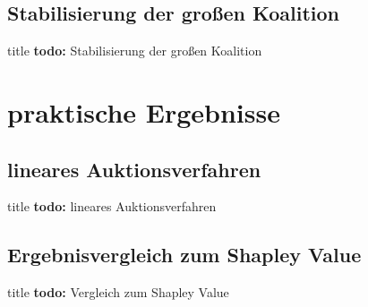 \documentclass[c]{beamer}
\newcommand\todo[1]{\colorbox{blue!15}{\textbf{todo: }#1}\newline}
\theoremstyle{break}
\begin{document}
  
  \subsection*{Stabilisierung der großen Koalition}
  \begin{frame}{title} %
    \todo{Stabilisierung der großen Koalition}
    \begin{lemma}[Instabilität]

    \end{lemma}
  \end{frame}

  \section*{praktische Ergebnisse}
  \subsection*{lineares Auktionsverfahren}
  \begin{frame}{title} %
    \todo{lineares Auktionsverfahren}
  \end{frame}
  
  \subsection*{Ergebnisvergleich zum Shapley Value}
  \begin{frame}{title} %
    \todo{Vergleich zum Shapley Value}
  \end{frame}
\end{document}
